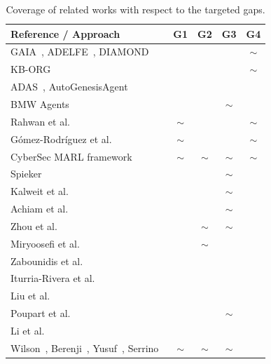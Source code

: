 \documentclass[pdflatex,sn-mathphys-num]{sn-jnl}%
\newcommand{\cmark}{\ding{51}}%
\newcommand{\xmark}{\ding{55}}%
\theoremstyle{thmstyleone}%
\theoremstyle{thmstyletwo}%
\theoremstyle{thmstylethree}%
\begin{document}
\begin{table}[t]
    \centering
    \caption{Coverage of related works with respect to the targeted gaps.}
    \label{tab:related_works}
    \begin{tabular}{p{5.5cm}cccc}
    \toprule
    \textbf{Reference / Approach} & \textbf{G1} & \textbf{G2} & \textbf{G3} & \textbf{G4} \\
    \midrule
    GAIA~\cite{gaia1998}, ADELFE~\cite{adelfe2002}, DIAMOND~\cite{Jamont2005} & \xmark & \xmark & \xmark & $\sim$ \\
    KB-ORG~\cite{Sims2008} & \xmark & \xmark & \xmark & $\sim$ \\
    ADAS~\cite{smith2024automated}, AutoGenesisAgent~\cite{harper2024autogenesisagent} & \xmark & \xmark & \xmark & \cmark \\
    BMW Agents~\cite{crawford2024bmw} & \xmark & \xmark & $\sim$ & \cmark \\
    Rahwan et al.~\cite{rahwan2006integrating} & $\sim$ & \xmark & \xmark & $\sim$ \\
    Gómez-Rodríguez et al.~\cite{gomez2011modeling} & $\sim$ & \xmark & \xmark & $\sim$ \\
    CyberSec MARL framework~\cite{hammar2023scalable} & $\sim$ & $\sim$ & $\sim$ & $\sim$ \\
    Spieker~\cite{spieker2021constraint} & \xmark & \cmark & $\sim$ & \xmark \\
    Kalweit et al.~\cite{kalweit2020deep} & \xmark & \cmark & $\sim$ & \xmark \\
    Achiam et al.~\cite{achiam2017constrained} & \xmark & \cmark & $\sim$ & \xmark \\
    Zhou et al.~\cite{zhou2024mentor} & \xmark & $\sim$ & $\sim$ & \xmark \\
    Miryoosefi et al.~\cite{miryoosefi2021} & \xmark & $\sim$ & \xmark & \xmark \\
    Zabounidis et al.~\cite{zabounidis2023concept} & \xmark & \xmark & \cmark & \xmark \\
    Iturria-Rivera et al.~\cite{iturria2024explainable} & \xmark & \xmark & \cmark & \xmark \\
    Liu et al.~\cite{liu2025} & \xmark & \xmark & \cmark & \xmark \\
    Poupart et al.~\cite{poupart2025perspectives} & \xmark & \xmark & $\sim$ & \xmark \\
    Li et al.~\cite{li2025from} & \xmark & \xmark & \cmark & \xmark \\
    Wilson~\cite{Williams2004}, Berenji~\cite{Zhang2013}, Yusuf~\cite{yusuf2020inferential}, Serrino~\cite{serrino2019finding} & $\sim$ & $\sim$ & $\sim$ & \xmark \\
    \bottomrule
    \end{tabular}
\end{table}
\end{document}

